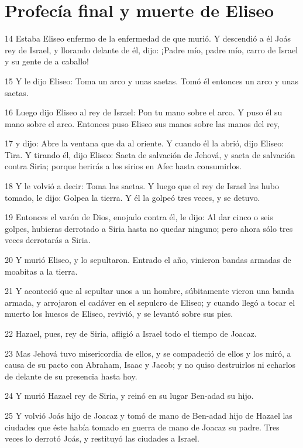 \section*{Profecía final y muerte de Eliseo}

\par 14 Estaba Eliseo enfermo de la enfermedad de que murió. Y descendió a él Joás rey de Israel, y llorando delante de él, dijo: ¡Padre mío, padre mío, carro de Israel y su gente de a caballo! 
\par 15 Y le dijo Eliseo: Toma un arco y unas saetas. Tomó él entonces un arco y unas saetas.
\par 16 Luego dijo Eliseo al rey de Israel: Pon tu mano sobre el arco. Y puso él su mano sobre el arco. Entonces puso Eliseo sus manos sobre las manos del rey,
\par 17 y dijo: Abre la ventana que da al oriente. Y cuando él la abrió, dijo Eliseo: Tira. Y tirando él, dijo Eliseo: Saeta de salvación de Jehová, y saeta de salvación contra Siria; porque herirás a los sirios en Afec hasta consumirlos.
\par 18 Y le volvió a decir: Toma las saetas. Y luego que el rey de Israel las hubo tomado, le dijo: Golpea la tierra. Y él la golpeó tres veces, y se detuvo.
\par 19 Entonces el varón de Dios, enojado contra él, le dijo: Al dar cinco o seis golpes, hubieras derrotado a Siria hasta no quedar ninguno; pero ahora sólo tres veces derrotarás a Siria.
\par 20 Y murió Eliseo, y lo sepultaron. Entrado el año, vinieron bandas armadas de moabitas a la tierra.
\par 21 Y aconteció que al sepultar unos a un hombre, súbitamente vieron una banda armada, y arrojaron el cadáver en el sepulcro de Eliseo; y cuando llegó a tocar el muerto los huesos de Eliseo, revivió, y se levantó sobre sus pies.
\par 22 Hazael, pues, rey de Siria, afligió a Israel todo el tiempo de Joacaz.
\par 23 Mas Jehová tuvo misericordia de ellos, y se compadeció de ellos y los miró, a causa de su pacto con Abraham, Isaac y Jacob; y no quiso destruirlos ni echarlos de delante de su presencia hasta hoy.
\par 24 Y murió Hazael rey de Siria, y reinó en su lugar Ben-adad su hijo.
\par 25 Y volvió Joás hijo de Joacaz y tomó de mano de Ben-adad hijo de Hazael las ciudades que éste había tomado en guerra de mano de Joacaz su padre. Tres veces lo derrotó Joás, y restituyó las ciudades a Israel.

